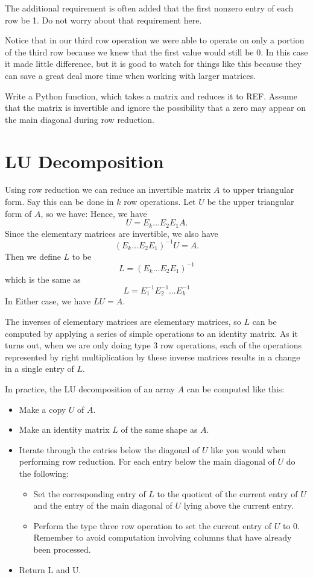 The additional requirement is often added that the first nonzero entry of each row be 1.
Do not worry about that requirement here.

Notice that in our third row operation we were able to operate on only a portion of the third row because we knew that the first value would still be 0.
In this case it made little difference, but it is good to watch for things like this because they can save a great deal more time when working with larger matrices.

\begin{problem}
\label{prob:REF}
Write a Python function, which takes a matrix and reduces it to REF.
Assume that the matrix is invertible and ignore the possibility that a zero may appear on the main diagonal during row reduction.
\end{problem}

\section*{LU Decomposition}

Using row reduction we can reduce an invertible matrix $A$ to upper triangular form.
Say this can be done in $k$ row operations.
Let $U$ be the upper triangular form of $A$, so we have:
Hence, we have
\[
U = E_k \dots E_2 E_1 A.
\]
Since the elementary matrices are invertible, we also have
\[
(E_k \dots E_2 E_1)^{-1} U =  A.
\]
Then we define $L$ to be
\[
L = (E_k \dots E_2 E_1)^{-1}
\]
which is the same as
\[
L = E_1^{-1} E_2^{-1} \dots E_k^{-1}
\]
In Either case, we have $L U = A$.

The inverses of elementary matrices are elementary matrices, so $L$ can be computed by applying a series of simple operations to an identity matrix.
As it turns out, when we are only doing type 3 row operations, each of the operations represented by right multiplication by these inverse matrices results in a change in a single entry of $L$.

In practice, the LU decomposition of an array $A$ can be computed like this:
\begin{itemize}
\item Make a copy $U$ of $A$.
\item Make an identity matrix $L$ of the same shape as $A$.
\item Iterate through the entries below the diagonal of $U$ like you would when performing row reduction.
For each entry below the main diagonal of $U$ do the following:
	\begin{itemize}
	\item Set the corresponding entry of $L$ to the quotient of the current entry of $U$ and the entry of the main diagonal of $U$ lying above the current entry.
	\item Perform the type three row operation to set the current entry of $U$ to 0.
		Remember to avoid computation involving columns that have already been processed.
	\end{itemize}
\item Return L and U.
\end{itemize}

